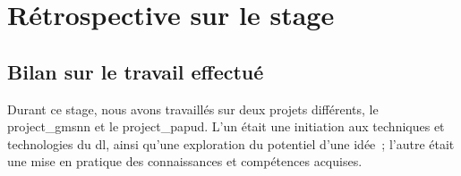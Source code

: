 






\chapter{Rétrospective sur le stage}
\section{Bilan sur le travail effectué}
Durant ce stage, nous avons travaillés sur deux projets différents, le \gls{project_gmsnn} et le \gls{project_papud}.
L'un était une initiation aux techniques et technologies du \gls{dl}, ainsi qu'une exploration du potentiel d'une idée~; l'autre était une mise en pratique des connaissances et compétences acquises.

